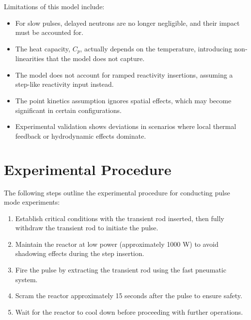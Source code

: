 Limitations of this model include:
\begin{itemize}
    \item For slow pulses, delayed neutrons are no longer negligible, and their impact must be accounted for.
    \item The heat capacity, $C_p$, actually depends on the temperature, introducing non-linearities that the model does not capture.
    \item The model does not account for ramped reactivity insertions, assuming a step-like reactivity input instead.
    \item The point kinetics assumption ignores spatial effects, which may become significant in certain configurations.
    \item Experimental validation shows deviations in scenarios where local thermal feedback or hydrodynamic effects dominate.
\end{itemize}

\section{Experimental Procedure}
The following steps outline the experimental procedure for conducting pulse mode experiments:
\begin{enumerate}
    \item Establish critical conditions with the transient rod inserted, then fully withdraw the transient rod to initiate the pulse.
    \item Maintain the reactor at low power (approximately 1000 W) to avoid shadowing effects during the step insertion.
    \item Fire the pulse by extracting the transient rod using the fast pneumatic system.
    \item Scram the reactor approximately 15 seconds after the pulse to ensure safety.
    \item Wait for the reactor to cool down before proceeding with further operations.
\end{enumerate}
